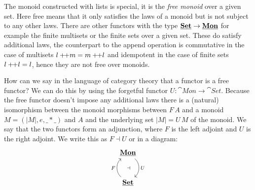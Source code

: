 The monoid constructed with lists is special, it is the \emph{free monoid} over a given set. Here free means that it only satisfies the laws of a monoid but is not subject to any other laws. There are other functors with the type $\underline{\mathbf{\mathbf{Set}}} \to \underline{\mathbf{Mon}}$ for example the finite multisets or the finite sets over a given set. These do satisfy additional laws, the counterpart to the append operation is commutative in the case of multisets $l +\!\!+ m = m +\!\!+ l$ and idempotent in the case of finite sets $l +\!\!+ l = l$, hence they are not free over monoids.

How can we say in the language of category theory that a functor is a free functor? We can do this by using the forgetful functor $U: \cat{Mon} \to \cat{Set}$. Because the free functor doesn't impose any additional laws there is a (natural) isomorphism between the monoid morphisms between $F\,A$ and a monoid $M = (|M|,e,\_*\_)$ and $A$ and the underlying set $|M| = U\,M$
of the monoid. We say that the two functors form an adjunction, where $F$ is the left adjoint and $U$ is the right adjoint. We write this as $F \dashv U$ or in a diagram:
\[\begin{tikzcd}[row sep=large]
\cat{Mon} \arrow[d,bend left = 50,"U" right,"\dashv" left = 10] \\ 
\cat{Set} \arrow[u,bend left = 50,"F" left, ]
\end{tikzcd}\]

